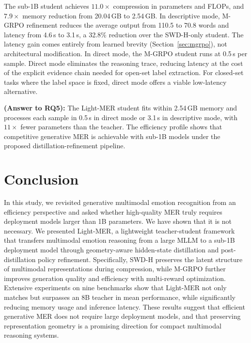 \documentclass[sigconf]{acmart}
\begin{document}
The sub-1B student achieves $11.0\times$ compression in parameters and FLOPs, and $7.9\times$ memory reduction from 20.04\,GB to 2.54\,GB. In descriptive mode, M-GRPO refinement reduces the average output from 110.5 to 70.8 words and latency from 4.6\,s to 3.1\,s, a 32.8\% reduction over the SWD-H-only student. The latency gain comes entirely from learned brevity (Section~\ref{sec:mgrpo}), not architectural modification. In direct mode, the M-GRPO student runs at 0.5\,s per sample. Direct mode eliminates the reasoning trace, reducing latency at the cost of the explicit evidence chain needed for open-set label extraction. For closed-set tasks where the label space is fixed, direct mode offers a viable low-latency alternative. 

\textbf{(Answer to RQ5):} The Light-MER student fits within 2.54\,GB memory and processes each sample in 0.5\,s in direct mode or 3.1\,s in descriptive mode, with $11\times$ fewer parameters than the teacher. The efficiency profile shows that competitive generative MER is achievable with sub-1B models under the proposed distillation-refinement pipeline.


\section{Conclusion}
In this study, we revisited generative multimodal emotion recognition from an efficiency perspective and asked whether high-quality MER truly requires deployment models larger than 1B parameters. We have shown  that it is not necessary. We presented Light-MER, a lightweight teacher-student framework that transfers multimodal emotion reasoning from a large MLLM to a sub-1B deployment model through geometry-aware hidden-state distillation and post-distillation policy refinement. Specifically, SWD-H preserves the latent structure of multimodal representations during compression, while M-GRPO further improves generation quality and efficiency with multi-reward optimization. Extensive experiments on nine benchmarks show that Light-MER not only matches but surpasses an 8B teacher in mean performance, while significantly reducing memory usage and inference latency. These results suggest that efficient generative MER does not require large deployment models, and that preserving representation geometry is a promising direction for compact multimodal reasoning systems.

\balance



\appendix
\end{document}
